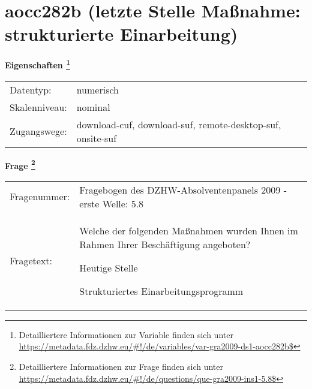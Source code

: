 
    \setcounter{footnote}{0}

    \vspace*{-1.8cm}
	\section{aocc282b (letzte Stelle Maßnahme: strukturierte Einarbeitung)}
	\label{section:aocc282b}



    \vspace*{0.5cm}
    \noindent\textbf{Eigenschaften
	\footnote{Detailliertere Informationen zur Variable finden sich unter
		\url{https://metadata.fdz.dzhw.eu/\#!/de/variables/var-gra2009-ds1-aocc282b$}}}\\
	\begin{tabularx}{\hsize}{@{}lX}
	Datentyp: & numerisch \\
	Skalenniveau: & nominal \\
	Zugangswege: &
	  download-cuf, 
	  download-suf, 
	  remote-desktop-suf, 
	  onsite-suf
 \\
    \end{tabularx}



				\vspace*{0.5cm}
                \noindent\textbf{Frage
	                \footnote{Detailliertere Informationen zur Frage finden sich unter
		              \url{https://metadata.fdz.dzhw.eu/\#!/de/questions/que-gra2009-ins1-5.8$}}}\\
				\begin{tabularx}{\hsize}{@{}lX}
					Fragenummer: &
					  Fragebogen des DZHW-Absolventenpanels 2009 - erste Welle:
					  5.8
 \\
					Fragetext: & Welche der folgenden Maßnahmen wurden Ihnen im Rahmen Ihrer Beschäftigung angeboten?\par  Heutige Stelle\par  Strukturiertes Einarbeitungsprogramm \\
				\end{tabularx}





